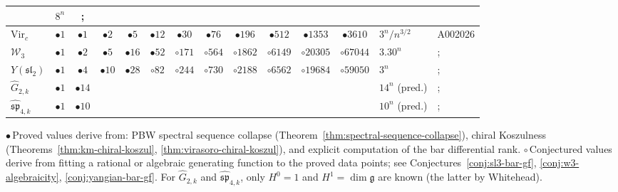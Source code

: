 \begin{table}[ht]
{\begin{tabular}{|l|ccccccccccc|l|l|}
 & $8^n$ &; \\
\hline
$\mathrm{Vir}_c$
 & $\bullet 1$ & $\bullet 1$ & $\bullet 2$ & $\bullet 5$ & $\bullet 12$ & $\bullet 30$ & $\bullet 76$ & $\bullet 196$ & $\bullet 512$ & $\bullet 1353$ & $\bullet 3610$
 & $3^n / n^{3/2}$ & A002026 \\
\hline
$\mathcal{W}_3$
 & $\bullet 1$ & $\bullet 2$ & $\bullet 5$ & $\bullet 16$ & $\bullet 52$ & $\circ 171$ & $\circ 564$ & $\circ 1862$ & $\circ 6149$ & $\circ 20305$ & $\circ 67044$
 & $3.30^n$ &; \\
\hline
$Y(\mathfrak{sl}_2)$
 & $\bullet 1$ & $\bullet 4$ & $\bullet 10$ & $\bullet 28$ & $\circ 82$ & $\circ 244$ & $\circ 730$ & $\circ 2188$ & $\circ 6562$ & $\circ 19684$ & $\circ 59050$
 & $3^n$ &; \\
\hline
$\widehat{G}_{2,k}$
 & $\bullet 1$ & $\bullet 14$ & & & & & & & & &
 & $14^n$ (pred.) &; \\
\hline
$\widehat{\mathfrak{sp}}_{4,k}$
 & $\bullet 1$ & $\bullet 10$ & & & & & & & & &
 & $10^n$ (pred.) &; \\
\hline
\end{tabular}
}

\medskip
\noindent
{\footnotesize
$\bullet$\,Proved values derive from:
PBW spectral sequence collapse (Theorem~\ref{thm:spectral-sequence-collapse}),
chiral Koszulness (Theorems~\ref{thm:km-chiral-koszul},
\ref{thm:virasoro-chiral-koszul}),
and explicit computation of the bar differential rank.
$\circ$\,Conjectured values derive from fitting a rational or algebraic
generating function to the proved data points; see
Conjectures~\ref{conj:sl3-bar-gf}, \ref{conj:w3-algebraicity},
\ref{conj:yangian-bar-gf}.
For $\widehat{G}_{2,k}$ and $\widehat{\mathfrak{sp}}_{4,k}$,
only $H^0 = 1$ and $H^1 = \dim\mathfrak{g}$ are known
(the latter by Whitehead).
}
\end{table}

